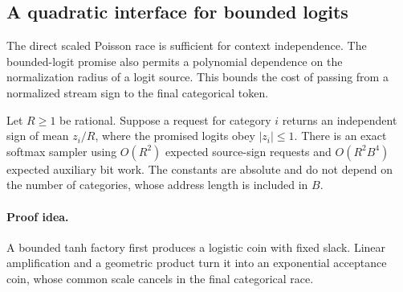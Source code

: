 \subsection{A quadratic interface for bounded logits}
\label{sec:quadratichead}

The direct scaled Poisson race is sufficient for context independence.
The bounded-logit promise also permits a polynomial dependence on the
normalization radius of a logit source. This bounds the cost of passing from a normalized stream sign to the
final categorical token.

\begin{theorem}
\label{thm:quadraticscaledhead}
Let $R\ge1$ be rational. Suppose a request for category $i$ returns
an independent sign of mean $z_i/R$, where the promised logits obey
$|z_i|\le1$. There is an exact softmax sampler using
$O(R^2)$ expected source-sign requests and $O(R^2B^4)$ expected
auxiliary bit work. The constants are absolute and do not depend on
the number of categories, whose address length is included in $B$.
\end{theorem}
\paragraph{Proof idea.}
A bounded tanh factory first produces a logistic coin with fixed slack.  Linear amplification and a geometric product turn it into an exponential acceptance coin, whose common scale cancels in the final categorical race.

